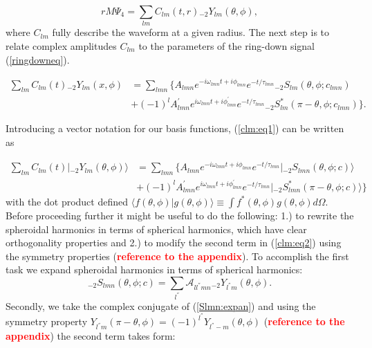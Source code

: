 \documentclass[11pt]{article}
\newcommand{\ket}[1]{|#1\rangle}
\newcommand{\braket}[2]{\langle #1|#2\rangle}
\begin{document}
\begin{equation}
rM\Psi_4 = \sum_{lm} C_{lm}(t,r) {}_{\minus 2}Y_{lm}(\theta, \phi),
\end{equation} 
where $C_{lm}$ fully describe the waveform at a given radius. The next step is to relate complex amplitudes $C_{lm}$ to the parameters of the ring-down signal (\ref{ringdowneq}). 

\begin{equation} \label{clm:eq1}
\begin{aligned}
\sum_{lm} C_{lm}(t) {}_{\minus 2}Y_{lm}(x, \phi) & = \sum_{lmn} \Big\{ A_{lmn} e^{-i\omega_{lmn}t+i\phi_{lmn}}e^{-t/\tau_{lmn}} {}_{\minus 2}S_{lm}(\theta, \phi ;c_{lmn})\\
& + (-1)^l A^{'}_{lmn} e^{i\omega_{lmn}t+i\phi^{'}_{lmn}}e^{-t/\tau_{lmn}} {}_{\minus 2}S^{*}_{lm}(\pi-\theta, \phi; c_{lmn}) \Big\}.
\end{aligned}
\end{equation}

\noindent
Introducing a vector notation for our basis functions, (\ref{clm:eq1}) can be written as  

\begin{equation} \label{clm:eq2}
\begin{aligned}
\sum_{lm} C_{lm}(t) \ket{{}_{\minus 2}Y_{lm}(\theta, \phi)} & = \sum_{lmn} \Big\{ A_{lmn} e^{-i\omega_{lmn}t+i\phi_{lmn}}e^{-t/\tau_{lmn}} \ket{{}_{\minus 2}S_{lmn}(\theta, \phi ;c)}\\
& + (-1)^l A^{'}_{lmn} e^{i\omega_{lmn}t+i\phi^{'}_{lmn}}e^{-t/\tau_{lmn}} \ket{{}_{\minus 2}S^{*}_{lmn}(\pi-\theta, \phi; c)} \Big\}
\end{aligned}
\end{equation}
with the dot product defined $\braket{f(\theta, \phi)}{g(\theta, \phi)} \equiv \int{f^{*}(\theta, \phi) g(\theta, \phi) d\Omega}$. Before proceeding further it might be useful to do the following: 1.) to rewrite the spheroidal harmonics in terms of spherical harmonics, which have clear orthogonality properties and 2.) to modify the second term in (\ref{clm:eq2}) using the symmetry properties (\textcolor{red}{\bf reference to the appendix}). To accomplish the first task we expand spheroidal harmonics in terms of spherical harmonics:
\begin{equation} \label{Slmn:expan}
{}_{\minus 2}S_{lmn}(\theta, \phi ;c) = \sum_{l^{''}} \mathcal{A}_{ll^{''}mn} {}_{\minus 2}Y_{l^{''}m}(\theta, \phi).
\end{equation}
\noindent
Secondly, we take the complex conjugate of (\ref{Slmn:expan}) and using the symmetry property $Y_{l^{''}m}(\pi-\theta, \phi) = (-1)^{l^{''}} Y_{l^{''}-m}(\theta, \phi)$ (\textcolor{red}{\bf reference to the appendix}) the second term takes form:
\end{document}

